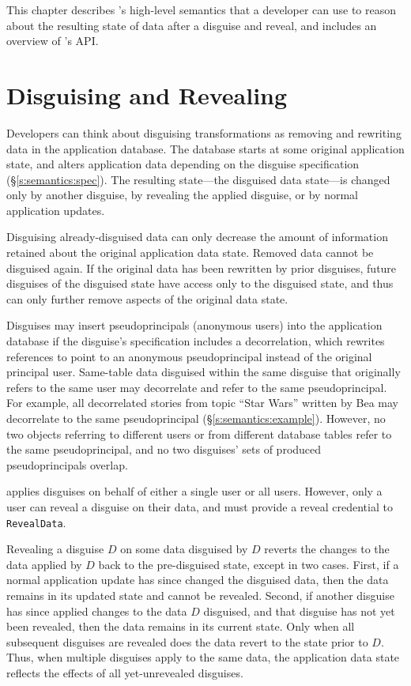 This chapter describes \sys's high-level semantics that a developer can use to
reason about the resulting state of data after a disguise and reveal, and 
includes an overview of \sys's API.

\section{Disguising and Revealing}
\label{s:semantics:hl}
Developers can think about disguising transformations as removing and rewriting
data in the application database.
%
The database starts at some original application state, and alters application
data depending on the disguise specification (\S\ref{s:semantics:spec}).  The
resulting state---the disguised data state---is changed only by another
disguise, by revealing the applied disguise, or by normal application updates.
%

%
Disguising already-disguised data can only decrease the amount of information
retained about the original application data state. Removed data cannot be
disguised again. If the original data has been rewritten by prior disguises,
future disguises of the disguised state have access only to the disguised state,
and thus can only further remove aspects of the original data state.
%

Disguises may insert pseudoprincipals (anonymous users) into the application
database if the disguise's specification includes a decorrelation, which
rewrites references to point to an anonymous pseudoprincipal instead of the
original principal user. 
%
Same-table data disguised within the same disguise that originally refers to the
same user may decorrelate and refer to the same pseudoprincipal.
%
For example, all decorrelated stories from topic ``Star Wars'' written by Bea
may decorrelate to the same pseudoprincipal (\S\ref{s:semantics:example}).
%
However, no two objects referring to different users or from different database
tables refer to the same pseudoprincipal, and no two disguises' sets of produced
pseudoprincipals overlap.
%

%
\sys applies disguises on behalf of either a single user or all users. However,
only a user can reveal a disguise on their data, and must provide a reveal
credential to \texttt{RevealData}.
%

%
Revealing a disguise $D$ on some data disguised by $D$ reverts the changes to
the data applied by $D$ back to the pre-disguised state, except in two cases.
First, if a normal application update has since changed the disguised data, then
the data remains in its updated state and cannot be revealed.
%
Second, if another disguise has since applied changes to the data $D$ disguised,
and that disguise has not yet been revealed, then the data remains in its
current state.
%
Only when all subsequent disguises are revealed does the data revert to the
state prior to $D$.
%
Thus, when multiple disguises apply to the same data, the application data state
reflects the effects of all yet-unrevealed disguises.
%

